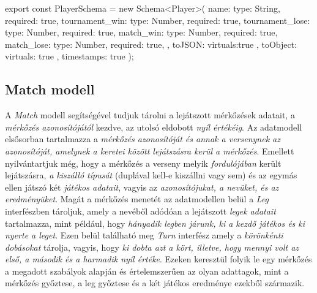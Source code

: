 \begin{cpp}
export const PlayerSchema = new Schema<Player>(
    {
        name: {type: String, required: true},
        tournament_win: {type: Number, required: true},
        tournament_lose: {type: Number, required: true},
        match_win: {type: Number, required: true},
        match_lose: {type: Number, required: true},
    },{
        toJSON: {
            virtuals:true
        },
        toObject: {
            virtuals: true
        },
        timestamps: true
    }
);
\end{cpp}

\subsection{Match modell}
A \textit{Match} modell segítségével tudjuk tárolni a lejátszott mérkőzések adatait, a \textit{mérkőzés azonosítójától} kezdve, az utolsó eldobott \textit{nyíl értékéig}. Az adatmodell elsősorban tartalmazza a \textit{mérkőzés azonosítóját és annak a versenynek az azonosítóját, amelynek a keretei között lejátszásra kerül a mérkőzés}. Emellett nyilvántartjuk még, hogy a mérkőzés a verseny melyik \textit{fordulójában} került lejátszásra, \textit{a kiszálló típusát} (duplával kell-e kiszállni vagy sem) és az egymás ellen játszó két \textit{játékos adatait}, vagyis az \textit{azonosítójukat, a nevüket, és az eredményüket}. Magát a mérkőzés menetét az adatmodellen belül a \textit{Leg} interfészben tároljuk, amely a nevéből adódóan a lejátszott \textit{legek adatait} tartalmazza, mint például, hogy \textit{hányadik legben járunk, ki a kezdő játékos és ki nyerte a leget}. Ezen belül található meg \textit{Turn} interfész amely a \textit{körönkénti dobásokat} tárolja, vagyis, hogy \textit{ki dobta azt a kört, illetve, hogy mennyi volt az első, a második és a harmadik nyíl értéke}. Ezeken keresztül folyik le egy mérkőzés a megadott szabályok alapján és értelemszerűen az olyan adattagok, mint a mérkőzés győztese, a leg győztese és a két játékos eredménye ezekből származik.

